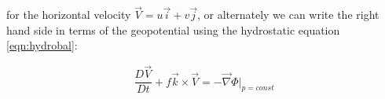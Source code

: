 for the horizontal velocity $\vec{V}=u\vec{i}+v\vec{j}$, or alternately we can write the right hand side in terms of the geopotential using the hydrostatic equation \ref{eqn:hydrobal}:

\begin{equation}
    \frac{D\vec{V}}{Dt}+f\vec{k}\times\vec{V}=-\vec{\nabla}\Phi|_{p=const}
    \label{eqn:momvec}
\end{equation}



 

